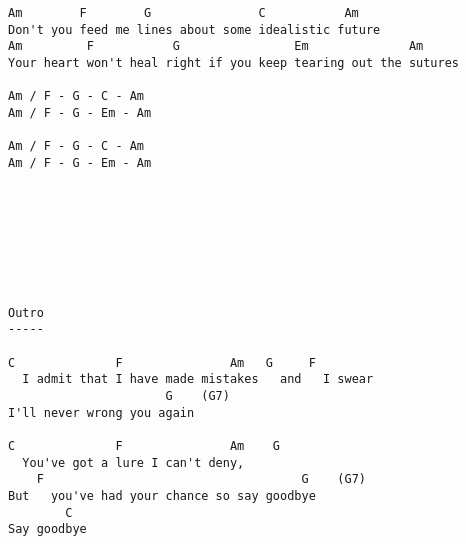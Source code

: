 \documentclass[leqno]{memoir}
\begin{document}
\begin{verbatim}
Am        F        G               C           Am
Don't you feed me lines about some idealistic future
Am         F           G                Em              Am
Your heart won't heal right if you keep tearing out the sutures

Am / F - G - C - Am
Am / F - G - Em - Am

Am / F - G - C - Am
Am / F - G - Em - Am








Outro
-----

C              F               Am   G     F
  I admit that I have made mistakes   and   I swear
                      G    (G7)
I'll never wrong you again

C              F               Am    G
  You've got a lure I can't deny,
    F                                    G    (G7)
But   you've had your chance so say goodbye
        C
Say goodbye
\end{verbatim}
\newpage
\end{document}
